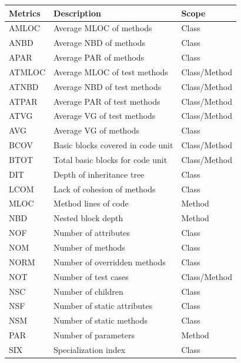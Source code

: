 \begin{table}[!tb]
  \centering
  \begin{threeparttable}
    \begin{tabular}{|l|l|l|}
      \hline
      \rowcolor[RGB]{169,196,223}
      \textbf{Metrics} & \textbf{Description} & \textbf{Scope} \\
      \hline AMLOC & Average MLOC of methods & Class \\
      \hline ANBD & Average NBD of methods & Class \\
      \hline APAR & Average PAR of methods & Class \\
      \hline ATMLOC & Average MLOC of test methods & Class/Method \\
      \hline ATNBD & Average NBD of test methods & Class/Method \\
      \hline ATPAR & Average PAR of test methods & Class/Method \\
      \hline ATVG & Average VG of test methods & Class/Method \\
      \hline AVG & Average VG of methods & Class \\
      \hline BCOV & Basic blocks covered in code unit & Class/Method \\
      \hline BTOT & Total basic blocks for code unit & Class/Method \\
      \hline DIT & Depth of inheritance tree & Class \\
      \hline LCOM & Lack of cohesion of methods & Class \\
      \hline MLOC & Method lines of code & Method \\
      \hline NBD & Nested block depth & Method \\
      \hline NOF & Number of attributes & Class \\
      \hline NOM & Number of methods & Class \\
      \hline NORM & Number of overridden methods & Class \\
      \hline NOT & Number of test cases & Class/Method \\
      \hline NSC & Number of children & Class \\
      \hline NSF & Number of static attributes & Class \\
      \hline NSM & Number of static methods & Class \\
      \hline PAR & Number of parameters & Method \\
      \hline SIX & Specialization index & Class \\

\end{tabular}
\end{threeparttable}
\end{table}
